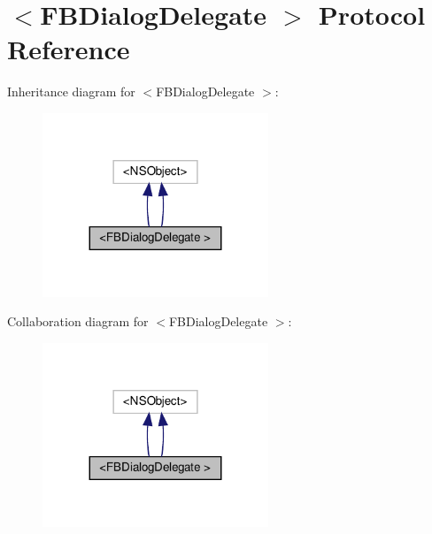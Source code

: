\hypertarget{protocolFBDialogDelegate_01-p}{}\section{$<$F\+B\+Dialog\+Delegate $>$ Protocol Reference}
\label{protocolFBDialogDelegate_01-p}


Inheritance diagram for $<$F\+B\+Dialog\+Delegate $>$\+:
\nopagebreak
\begin{figure}[H]
\begin{center}
\leavevmode
\includegraphics[width=191pt]{protocolFBDialogDelegate_01-p__inherit__graph}
\end{center}
\end{figure}


Collaboration diagram for $<$F\+B\+Dialog\+Delegate $>$\+:
\nopagebreak
\begin{figure}[H]
\begin{center}
\leavevmode
\includegraphics[width=191pt]{protocolFBDialogDelegate_01-p__coll__graph}
\end{center}
\end{figure}
